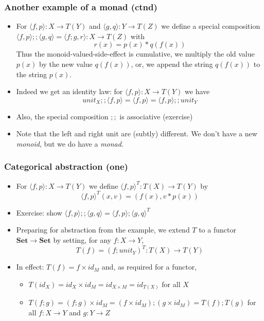 \documentclass[handout]{beamer}
\newcommand{\bfsf}[1]{{\boldsymbol{#1}}}
\newcommand{\Set}{\bfsf{Set}}
\newcommand{\Kp}[1]{{\langle #1 \rangle}}
\newcommand{\Kc}{;\!;}
\begin{document}
\frame
  {   
    \frametitle{Another example of a monad (ctnd)}\label{Mon5:ExaSetMctnd}

 \begin{itemize}[<+->]
\item For $\Kp{f,p}: X\to T(Y)$ and $\Kp{g,q}: Y\to T(Z)$ we define a special
composition $\Kp{f,p}\Kc \Kp{g,q} = \Kp{f;g,r} : X\to T(Z)$ with $$r(x)=p(x)*q(f(x))$$
Thus the monoid-valued-side-effect is cumulative,
we multiply the old value $p(x)$ by the new value $q(f(x))$,
or, we append the string $q(f(x))$ to the string $p(x)$.
\item Indeed we get an identity law: for $\Kp{f,p}: X\to T(Y)$ we have
$$unit_X\Kc \Kp{f,p}  = \Kp{f,p} = \Kp{f,p}\Kc unit_Y$$
\item Also, the special composition $\Kc$ is associative  (exercise)
\item Note that the left and right unit are (subtly) different.
We don't have a new \emph{monoid}, but we do have a \emph{monad}.
 \end{itemize}

 }

\frame
  {   
    \frametitle{Categorical abstraction (one)}\label{Mon5:CatAbstrOne}

 \begin{itemize}[<+->]
\item For $\Kp{f,p} : X\to T(Y)$ we define $\Kp{f,p}^T : T(X)\to T(Y)$ by
$$\Kp{f,p}^T(x,v) = (f(x),v*p(x))$$
\item Exercise: show $\Kp{f,p}\Kc\Kp{g,q} = \Kp{f,p};\Kp{g,q}^T$
\item Preparing for abstraction from the example,
we extend $T$ to a functor $\Set\to\Set$ 
by setting, for any $f:X\to Y$,  $$T(f) = (f; unit_Y)^T : T(X)\to T(Y)$$
\item In effect: $T(f) = f\times id_M$ and, as required for a functor,
\begin{itemize}
\item
$T(id_X) = id_X \times id_M = id_{X\times M} = id_{T(X)}$  for all $X$
\item $T(f;g) = (f;g)\times id_M = (f\times id_M);(g\times id_M) = T(f); T(g)$
for all $f:X\to Y$ and $g:Y\to Z$
\end{itemize}
 \end{itemize}

 }
\end{document}
